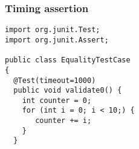 \begin{frame}[fragile, hasprev=false, hasnext=false]
\frametitle{Timing assertion}
\label{example:junit-timing-assertion}

\begin{lstlisting}
import org.junit.Test;
import org.junit.Assert;

public class EqualityTestCase
{
  @Test(timeout=1000)
  public void validate0() {
    int counter = 0;
    for (int i = 0; i < 10;) {
       counter += i;
    }
  }
\end{lstlisting}
\end{frame}